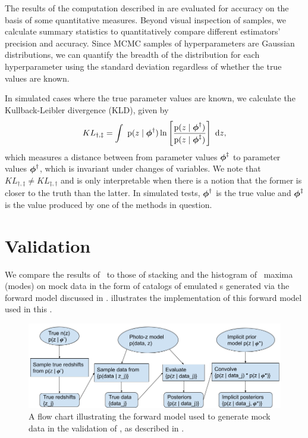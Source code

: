 The results of the computation described in  are evaluated for accuracy on the basis of some quantitative measures.  
Beyond visual inspection of samples, we calculate summary statistics to quantitatively compare different estimators' precision and accuracy.  
Since MCMC samples of hyperparameters are Gaussian distributions, we can quantify the breadth of the distribution for each hyperparameter using the standard deviation regardless of whether the true values are known.  

In simulated cases where the true parameter values are known, we calculate the Kullback-Leibler divergence (KLD), given by 
\begin{equation}
\eqlabel{eq:kl}
KL_{\dagger,\ddagger} = \integral{\pr{z \gvn \ndphi^{\dagger}} \ln \left[ \frac{\pr{z \gvn \ndphi^{\dagger}}}{\pr{z \gvn \ndphi^{\ddagger}}} \right]}{z} ,
\end{equation}
which measures a distance between from parameter values ${\boldsymbol{\phi}}^{\ddagger}$ to parameter values ${\boldsymbol{\phi}}^{\dagger}$, which is invariant under changes of variables.  
We note that $KL_{\dagger,\ddagger} \neq KL_{\ddagger,\dagger}$ and is only interpretable when there is a notion that the former is closer to the truth than the latter.
In simulated tests, ${\boldsymbol{\phi}}^{\dagger}$ is the true value and ${\boldsymbol{\phi}}^{\ddagger}$ is the value produced by one of the methods in question.  

\section{Validation}

We compare the results of \Chippr\ to those of stacking and the histogram of \pzpdf\ maxima (modes) on mock data in the form of catalogs of emulated \pzpdf s generated via the forward model discussed in .
 illustrates the implementation of this forward model used in this \paper.

\begin{figure}
	\begin{center}
		\includegraphics[width=\textwidth]{figures/chippr/flowchart.png}
		\caption{A flow chart illustrating the forward model used to generate mock data in the validation of \Chippr, as described in .}
	\end{center}
\end{figure}

